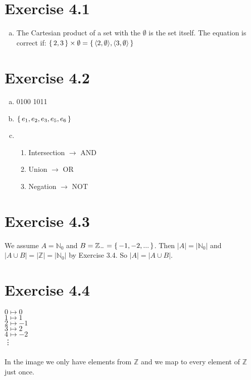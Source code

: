 \documentclass{article} %
\newcommand{\homeworkNumber}{4}
\begin{document}
\section*{Exercise \homeworkNumber.1}

\begin{enumerate}[a)]
	\item The Cartesian product of a set with the $\emptyset$ is the set itself. The equation is correct if: $\set{2, 3} \times \emptyset = \set{\langle 2, \emptyset \rangle, \langle 3, \emptyset \rangle}$
\end{enumerate}

\section*{Exercise \homeworkNumber.2}

\begin{enumerate}[a)]
	\item 0100 1011
	\item $\set{e_1, e_2, e_3, e_5, e_6}$
	\item 
	\begin{enumerate}[]
		\item Intersection $\rightarrow$ AND
		\item Union $\rightarrow$ OR
		\item Negation $\rightarrow$ NOT
	\end{enumerate}
\end{enumerate}


\section*{Exercise \homeworkNumber.3}

We assume $A = \mathbb{N}_0$ and $B = \mathbb{Z}_- = \set{-1, -2, ...}$. Then $|A| = |\mathbb{N}_0|$ and $|A \cup B| = |\mathbb{Z}| = |\mathbb{N}_0|$ by Exercise 3.4. So $|A| = |A \cup B|$.

\section*{Exercise \homeworkNumber.4}

$0 \mapsto 0$\\
$1 \mapsto 1$\\
$2 \mapsto -1$\\
$3 \mapsto 2$\\
$4 \mapsto -2$\\
\vdots\\\\
In the image we only have elements from $\mathbb{Z}$ and we map to every element of $\mathbb{Z}$ just once.
\end{document}
